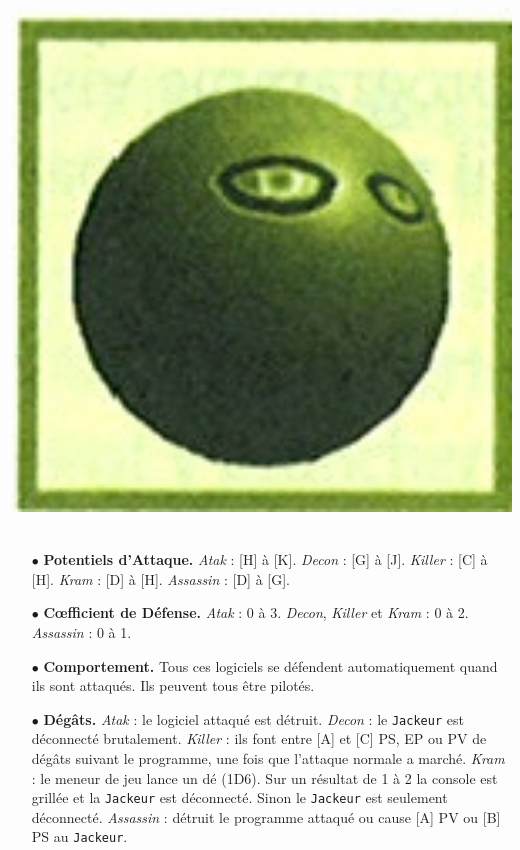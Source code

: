 \documentclass[11pt,twoside,a4paper]{article}
\begin{document}
\begin{multicols*}{2}
\begin{minipage}[h]{0.12\textwidth}
	\includegraphics[width=1.20\textwidth]{img/catalogueProgrammesTueur02.jpg}~\\
\end{minipage} \hfill \begin{minipage}[h]{0.37\textwidth}
	\begin{itemize}
		\small
		\item[$\bullet$] \textbf{Potentiels d'Attaque. }\emph{Atak} : [H] {\`a} [K]. \emph{Decon} : [G] {\`a} [J].  \emph{Killer} : [C] {\`a} [H]. \emph{Kram} : [D] {\`a} [H]. \emph{Assassin} : [D] {\`a} [G].  
		\item[$\bullet$] \textbf{C\oe fficient de D{\'e}fense. }\emph{Atak} : 0 {\`a} 3. \emph{Decon}, \emph{Killer} et \emph{Kram} : 0 {\`a} 2. \emph{Assassin} : 0 {\`a} 1.  
	\end{itemize}
\end{minipage}
\begin{itemize} 
	\item[$\bullet$] \textbf{Comportement. }Tous ces logiciels se d{\'e}fendent automatiquement quand ils sont attaqu{\'e}s. Ils peuvent tous {\^e}tre pilot{\'e}s. 
	\item[$\bullet$] \textbf{D{\'e}g{\^a}ts. }\emph{Atak} : le logiciel attaqu{\'e} est d{\'e}truit. \emph{Decon} : le \texttt{Jackeur} est d{\'e}connect{\'e} brutalement.  \emph{Killer} : ils font entre [A] et [C] PS, EP ou PV de d{\'e}g{\^a}ts suivant le programme, une fois que l'attaque normale a march{\'e}. \emph{Kram} : le meneur de jeu lance un d{\'e} (1D6). Sur un r{\'e}sultat de 1 {\`a} 2 la console est grill{\'e}e et la \texttt{Jackeur} est d{\'e}connect{\'e}. Sinon le \texttt{Jackeur} est seulement d{\'e}connect{\'e}. \emph{Assassin} : d{\'e}truit le programme attaqu{\'e} ou cause [A] PV ou [B] PS au \texttt{Jackeur}. 

\end{itemize}
\end{multicols*}
\end{document}
